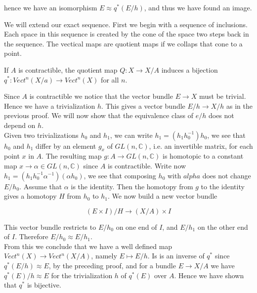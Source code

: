 \documentclass[../Thesis.tex]{subfiles}
\begin{document}
\begin{myproof}
hence we have an isomorphism $E \approx q^*(E/h)$, and thus we have found an image.
\end{myproof}
We will extend our exact sequence. First we begin with a sequence of inclusions. Each space in this sequence is created by the cone of the space two steps back in the sequence. The vectical maps are quotient maps if we collaps that cone to a point.
 \\    
\begin{Cor}
If $A$ is contractible, the quotient map $Q : X \rightarrow X/A$ induces a bijection $q^* : Vect^n(X/a) \rightarrow Vect^n(X)$ for all $n$.
\end{Cor}
\begin{myproof}
Since $A$ is contractible we notice that the vector bundle $E \rightarrow X$ must be trivial. Hence we have a trivialization $h$. This gives a vector bundle $E/h \rightarrow X/h$ as in the previous proof. We will now show that the equivalence class of $e/h$ does not depend on $h$.
\\Given two trivializations $h_0$ and $h_1$, we can write $h_1 =  (h_1h_0^{-1})h_0$, we see that $h_0$ and $h_1$ differ by an element $g_x$ of $GL(n, \mathbb{C})$, i.e. an invertible matrix, for each point $x$ in $A$. The resulting map $g : A \rightarrow GL(n, \mathbb{C})$ is homotopic to a constant map $x \rightarrow \alpha \in GL(n, \mathbb{C})$ since $A$ is contractible. Write now $h_1 = (h_1h_0^{-1}\alpha^{-1})(\alpha h_0)$, we see that composing $h_0$ with $alpha$ does not change $E/h_0$. Assume that $\alpha$ is the identity. 
Then the homotopy from $g$ to the identity gives a homotopy $H$ from $h_0$ to $h_1$. We now build a new vector bundle

\begin{equation}
(E \times I)/H \rightarrow (X/A) \times I
\end{equation}

This vector bundle restricts to $E/h_0$ on one end of $I$, and $E/h_1$ on the other end of $I$. Therefore $E/h_0 \approx E/h_1$.
\\From this we conclude that we have a well defined map $Vect^n(X) \rightarrow Vect^n(X/A)$, namely $E \mapsto E/h$. Is is an inverse of $q^*$ since $q^*(E/h) \approx E$, by the preceding proof, and for a bundle $E \rightarrow X/A$ we have $q^*(E)/h \approx E$ for the trivialization $h$ of $q^*(E)$ over $A$. Hence we have shown that $q^*$ is bijective.
\end{myproof}
\end{document}
